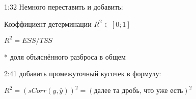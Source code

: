 \documentclass[12pt,a4paper]{article}
\begin{document}
1:32 Немного переставить и добавить:

Коэффициент детерминации $R^2 \in [0;1]$ 

$R^2=ESS/TSS$

* доля объяснённого разброса в общем 


2:41 добавить промежуточный кусочек в формулу:

$R^2=(sCorr(y,\hat{y}))^2= (\text{далее та дробь, что уже есть})^2$
\end{document}
